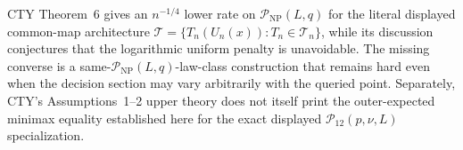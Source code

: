 CTY Theorem~6 gives an \(n^{-1/4}\) lower rate on \(\mathcal P_{\mathrm{NP}}(L,q)\) for the literal displayed common-map architecture \(\mathcal T=\{T_n(U_n(x)):T_n\in\mathcal T_n\}\), while its discussion conjectures that the logarithmic uniform penalty is unavoidable.  The missing converse is a same-\(\mathcal P_{\mathrm{NP}}(L,q)\)-law-class construction that remains hard even when the decision section may vary arbitrarily with the queried point.  Separately, CTY's Assumptions~1--2 upper theory does not itself print the outer-expected minimax equality established here for the exact displayed \(\mathcal P_{12}(p,\nu,L)\) specialization.